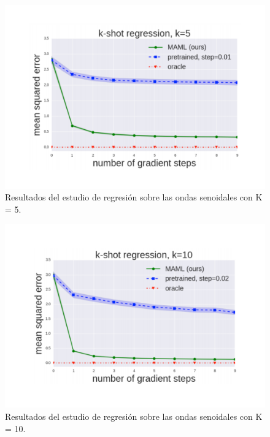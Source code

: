 \begin{figure}[H]
\begin{center}
 \includegraphics[width=0.8\linewidth]{Figuras/MAML/sinusoid_1.pdf}
\end{center}
\caption{Resultados del estudio de regresión sobre las ondas senoidales con K = 5.}
 \label{fig:sinusoid_results_1}
\end{figure}

\begin{figure}[H]
\begin{center}
 \includegraphics[width=0.8\linewidth]{Figuras/MAML/sinusoid_2.pdf}
\end{center}
\caption{Resultados del estudio de regresión sobre las ondas senoidales con K = 10.}
 \label{fig:sinusoid_results_2}
\end{figure}

